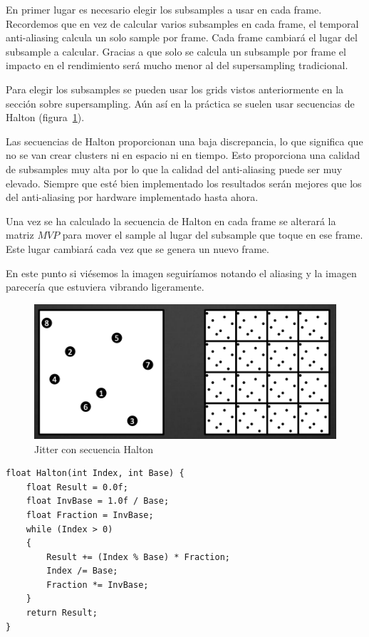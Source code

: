 \documentclass[withindex, glossary]{cam-thesis}
\begin{document}
En primer lugar es necesario elegir los subsamples a usar en cada frame. Recordemos que en vez de calcular varios subsamples en cada frame, el temporal anti-aliasing calcula un solo sample por frame. Cada frame cambiará el lugar del subsample a calcular. Gracias a que solo se calcula un subsample por frame el impacto en el rendimiento será mucho menor al del supersampling tradicional.

Para elegir los subsamples se pueden usar los grids vistos anteriormente en la sección sobre supersampling\cite{unrealtaa}. Aún así en la práctica se suelen usar secuencias de Halton (figura~\ref{halton}).

Las secuencias de Halton proporcionan una baja discrepancia, lo que significa que no se van crear clusters ni en espacio ni en tiempo. Esto proporciona una calidad de subsamples muy alta por lo que la calidad del anti-aliasing puede ser muy elevado. Siempre que esté bien implementado los resultados serán mejores que los del anti-aliasing por hardware implementado hasta ahora\cite{unrealtaa}.

Una vez se ha calculado la secuencia de Halton en cada frame se alterará la matriz $MVP$ para mover el sample al lugar del subsample que toque en ese frame. Este lugar cambiará cada vez que se genera un nuevo frame.

En este punto si viésemos la imagen seguiríamos notando el aliasing y la imagen parecería que estuviera vibrando ligeramente.

\begin{figure}[!htbp]
    \includegraphics[width=\linewidth]{figures/halton.png}
    \caption{Jitter con secuencia Halton}
    \label{halton}
\end{figure}

\begin{verbatim}
float Halton(int Index, int Base) {
    float Result = 0.0f;
    float InvBase = 1.0f / Base;
    float Fraction = InvBase;
    while (Index > 0)
    {
        Result += (Index % Base) * Fraction;
        Index /= Base;
        Fraction *= InvBase;
    }
    return Result;
}
\end{verbatim}
\end{document}

